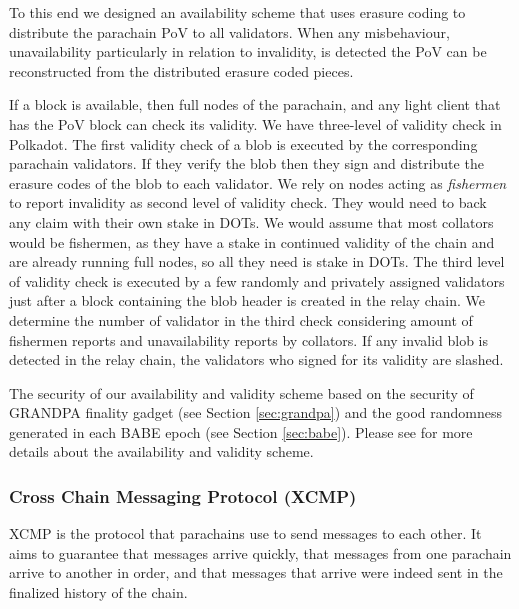 To this end we designed an availability scheme that uses erasure coding \cite{} to distribute the parachain PoV to all validators.
When any misbehaviour, unavailability particularly in relation to invalidity, is detected the PoV can be reconstructed from the distributed erasure coded pieces.

If a block is available, then full nodes of the parachain, and any light client that has the PoV block can check its validity. We have three-level of validity check in Polkadot. The first validity check of a blob is executed by the corresponding parachain validators. If they verify the blob then they sign and distribute the erasure codes of the blob to each validator.
We rely on nodes acting as {\em fishermen} to report invalidity as second level of validity check. They would need to back any claim with their own stake in DOTs. We would assume that most collators would be fishermen, as they have a stake in continued validity of the chain and are already running full nodes, so all they need is stake in DOTs. The third level of validity check is executed by a few randomly and privately assigned validators just after a block containing the blob header is created in the relay chain. We determine the number of validator in the third check considering amount of fishermen reports and unavailability reports by collators. If  any invalid blob is detected in the relay chain, the validators who signed for its validity are slashed.

The security of our availability and validity scheme based on the security of GRANDPA finality gadget (see Section \ref{sec:grandpa}) and the good randomness generated in each BABE epoch (see Section \ref{sec:babe}). Please see \cite{availandvalid} for more details about the availability and validity scheme.


\subsubsection{Cross Chain Messaging Protocol (XCMP)} \label{sec:XCMP}
XCMP is the protocol that parachains use to send messages to each other. It aims to guarantee that messages arrive quickly, that messages from one parachain arrive to another in order,
and that messages that arrive were indeed sent in the finalized history of the chain.

